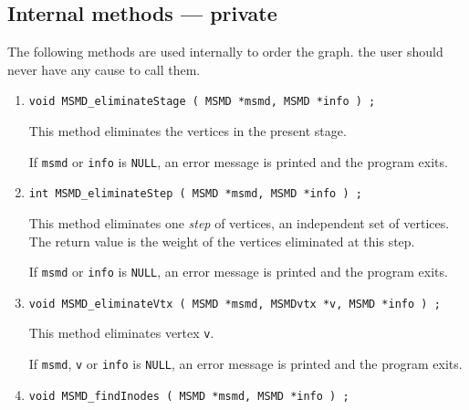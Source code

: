 \subsection{Internal methods --- private}
\label{subsection:MSMD:proto:private}
\par
The following methods are used internally to order the graph.
the user should never have any cause to call them.
\par
\begin{enumerate}
\item
\begin{verbatim}
void MSMD_eliminateStage ( MSMD *msmd, MSMD *info ) ;
\end{verbatim}
This method eliminates the vertices in the present stage.
\par {}
If {\tt msmd} or {\tt info} is {\tt NULL},
an error message is printed and the program exits.
\item
\begin{verbatim}
int MSMD_eliminateStep ( MSMD *msmd, MSMD *info ) ;
\end{verbatim}
This method eliminates one {\it step} of vertices, an independent
set of vertices.
The return value is the weight of the vertices eliminated at this
step.
\par {}
If {\tt msmd} or {\tt info} is {\tt NULL},
an error message is printed and the program exits.
\item
\begin{verbatim}
void MSMD_eliminateVtx ( MSMD *msmd, MSMDvtx *v, MSMD *info ) ;
\end{verbatim}
This method eliminates vertex {\tt v}.
\par {}
If {\tt msmd}, {\tt v} or {\tt info} is {\tt NULL},
an error message is printed and the program exits.
\item
\begin{verbatim}
void MSMD_findInodes ( MSMD *msmd, MSMD *info ) ;
\end{verbatim}

\end{enumerate}
